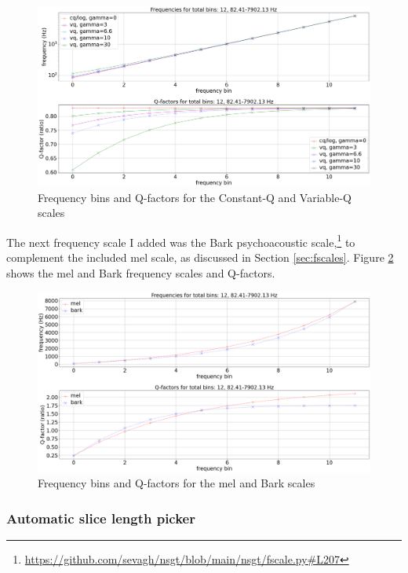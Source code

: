 \documentclass[report.tex]{subfiles}
\begin{document}
\begin{figure}[ht]
	\centering
	\includegraphics[width=\textwidth]{./images-freqscales/vqlog.png}
	\caption{Frequency bins and Q-factors for the Constant-Q and Variable-Q scales}
	\label{fig:vq}
\end{figure}

The next frequency scale I added was the Bark psychoacoustic scale,\footnote{\url{https://github.com/sevagh/nsgt/blob/main/nsgt/fscale.py\#L207}} to complement the included mel scale, as discussed in Section \ref{sec:fscales}. Figure \ref{fig:melbarkfsandqs} shows the mel and Bark frequency scales and Q-factors.

\begin{figure}[ht]
	\centering
	\includegraphics[width=\textwidth]{./images-freqscales/melbarkpitchesqs.png}
	\caption{Frequency bins and Q-factors for the mel and Bark scales}
	\label{fig:melbarkfsandqs}
\end{figure}

\subsubsection{Automatic slice length picker}
\label{sec:sllenpicker}
\end{document}
